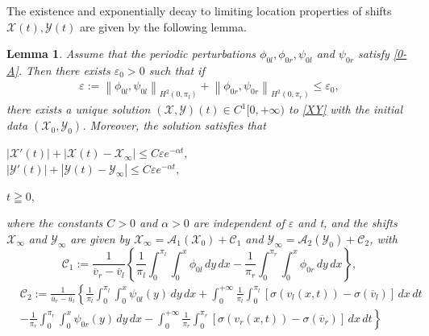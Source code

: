 \documentclass[12pt,reqno]{amsart}
\numberwithin{equation}{section}
\newcommand{\norm}[1]{\left\lVert #1 \right\rVert}
\def\avl{\overline{v}_l}
\def\avr{\overline{v}_r}
\def\aul{\overline{u}_l}
\def\aur{\overline{u}_r}
\def\X{\mathcal{X}}
\def\Y{\mathcal{Y}}
\newtheorem{lemma}[theorem]{Lemma}
\begin{document}
The existence and exponentially decay to limiting location properties of shifts $\X(t),\Y(t)$ are given by the following lemma.
\begin{lemma}\label{XYdecay}
	Assume that the periodic perturbations $\phi_{0l},\phi_{0r},\psi_{0l}$ and $\psi_{0r}$ satisfy \eqref{0-A}. Then there exists $\varepsilon_0>0$ such that
	if 
	\begin{align}\label{small assumption for shifts}
		\varepsilon:=\norm{\phi_{0l},\psi_{0l}}_{H^2(0,\pi_l)}+\norm{\phi_{0r},\psi_{0r}}_{H^2(0,\pi_r)}\leq \varepsilon_0,
	\end{align}
	there exists a unique solution $(\X,\Y)(t) \in C^1[0,+\infty)$ to \eqref{XY} with the initial data $(\X_0,\Y_0)$. Moreover, the solution satisfies that
	\begin{center}
		\begin{minipage}[c]{7cm}
			$ |\X'(t)|+\left|\mathcal{X}(t)-\mathcal{X}_{\infty}\right| \leq  C \varepsilon e^{-\alpha t},$ \\
		  $|\Y'(t)|+\left|\mathcal{Y}(t)-\mathcal{Y}_{\infty}\right| \leq C \varepsilon e^{-\alpha t},$
		\end{minipage}
		\begin{minipage}[c]{2cm} 
			$ t \geqq 0,$
		\end{minipage}
	\end{center}
	where the constants $C>0$ and $\alpha>0$ are independent of $\varepsilon$ and t, and the shifts $\X_{\infty}$ and $\Y_{\infty}$ are given by $\X_{\infty}=\mathcal{A}_1(\X_0)+\mathcal{C} _1$
	and $\Y_{\infty}=\mathcal{A} _2(\Y_0)+\mathcal{C} _2$, with
	\begin{equation}\label{C1}
		\mathcal{C} _1:=\frac{1}{\avr-\avl}\left\{\frac{1}{\pi_l}\int_{0}^{\pi_l} \int_{0}^{x} \phi_{0l} \,dy  \,dx -\frac{1}{\pi_r}\int_{0}^{\pi_r} \int_{0}^{x} \phi_{0r} \,dy  \,dx\right\},
	\end{equation}
	\begin{equation}\label{C2}
		\begin{aligned}
		&\mathcal{C}_2:=\frac{1}{\aur-\aul}\left\{\frac{1}{\pi_l}\int_{0}^{\pi_l} \int_{0}^{x} \psi_{0l}(y) \,dy  \,dx+\int_{0}^{+\infty}\frac{1}{\pi_l}\int_{0}^{\pi_l}[\sigma(v_l(x,t))-\sigma(\avl)] \,dx \,dt\right.\\ 
		&\left.-\frac{1}{\pi_r}\int_{0}^{\pi_r} \int_{0}^{x} \psi_{0r}(y) \,dy  \,dx-\int_{0}^{+\infty}\frac{1}{\pi_r}\int_{0}^{\pi_r}[\sigma(v_r(x,t))-\sigma(\avr)] \,dx \,dt\right\}
	    \end{aligned}
	\end{equation}
\end{lemma}
\end{document}
